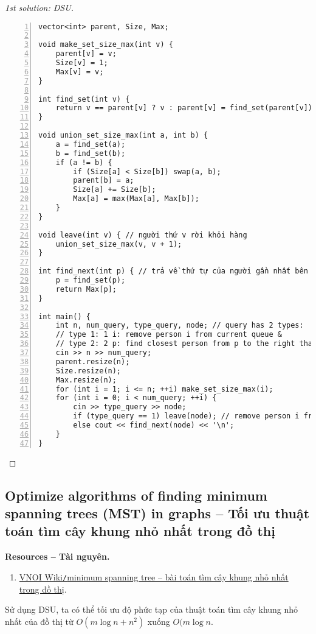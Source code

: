 \documentclass{article}
\begin{document}
\begin{proof}[1st solution: DSU]
\begin{Verbatim}[numbers=left,xleftmargin=5mm]
vector<int> parent, Size, Max;

void make_set_size_max(int v) {
    parent[v] = v;
    Size[v] = 1;
    Max[v] = v;
}

int find_set(int v) {
    return v == parent[v] ? v : parent[v] = find_set(parent[v]);
}

void union_set_size_max(int a, int b) {
    a = find_set(a);
    b = find_set(b);
    if (a != b) {
        if (Size[a] < Size[b]) swap(a, b);
        parent[b] = a;
        Size[a] += Size[b];
        Max[a] = max(Max[a], Max[b]);
    }
}

void leave(int v) { // người thứ v rời khỏi hàng
    union_set_size_max(v, v + 1);
}

int find_next(int p) { // trả về thứ tự của người gần nhất bên phải vị trí p mà chưa rời khỏi hàng
    p = find_set(p);
    return Max[p];
}

int main() {
    int n, num_query, type_query, node; // query has 2 types:
    // type 1: 1 i: remove person i from current queue &
    // type 2: 2 p: find closest person from p to the right that is still in the queue
    cin >> n >> num_query;
    parent.resize(n);
    Size.resize(n);
    Max.resize(n);
    for (int i = 1; i <= n; ++i) make_set_size_max(i);
    for (int i = 0; i < num_query; ++i) {
        cin >> type_query >> node;
        if (type_query == 1) leave(node); // remove person i from current queue
        else cout << find_next(node) << '\n';
    }
}
    \end{Verbatim}
\end{proof}


\subsection{Optimize algorithms of finding minimum spanning trees (MST) in graphs -- Tối ưu thuật toán tìm cây khung nhỏ nhất trong đồ thị}
\textbf{\textsf{Resources -- Tài nguyên.}}
\begin{enumerate}
    \item \href{https://wiki.vnoi.info/algo/graph-theory/minimum-spanning-tree.md}{VNOI Wiki{\tt/}minimum spanning tree -- bài toán tìm cây khung nhỏ nhất trong đồ thị}.
\end{enumerate}
Sử dụng DSU, ta có thể tối ưu độ phức tạp của thuật toán tìm cây khung nhỏ nhất của đồ thị từ $O(m\log n + n^2)$ xuống $O(m\log n$.
\end{document}
